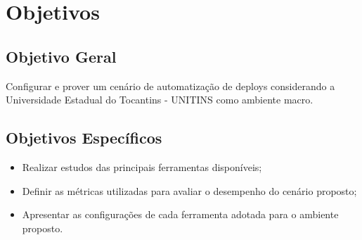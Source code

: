 \chapter{Objetivos}\label{cap:objetivos}

\section{Objetivo Geral }
Configurar e prover um cenário de automatização de deploys considerando a Universidade Estadual do Tocantins - UNITINS como ambiente macro.


\section{Objetivos Específicos}
\begin{itemize}
	\item Realizar estudos das principais ferramentas disponíveis;
	\item Definir as métricas utilizadas para avaliar o desempenho do cenário proposto;
	\item Apresentar as configurações de cada ferramenta adotada para o ambiente proposto.
\end{itemize}

